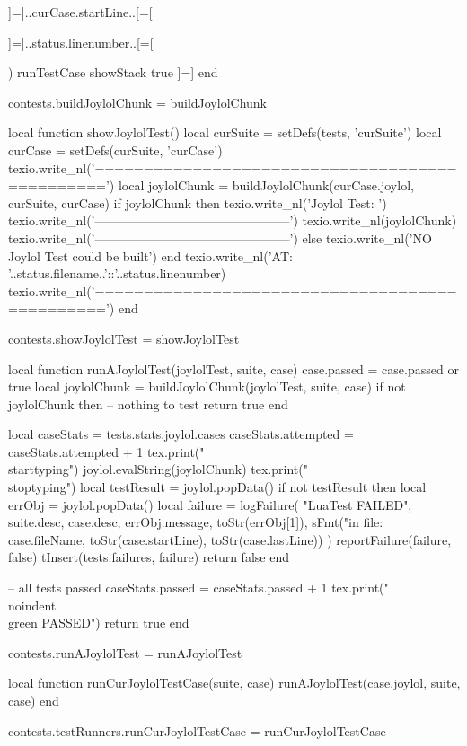   ]=]..curCase.startLine..[=[

  ]=]..status.linenumber..[=[

)
runTestCase
showStack
true
]=]
end

contests.buildJoylolChunk = buildJoylolChunk

local function showJoylolTest()
  local curSuite = setDefs(tests, 'curSuite')
  local curCase  = setDefs(curSuite, 'curCase')
  texio.write_nl('===============================================')
  local joylolChunk =
    buildJoylolChunk(curCase.joylol, curSuite, curCase)
  if joylolChunk then
    texio.write_nl('Joylol Test: ')
    texio.write_nl('-----------------------------------------------')
    texio.write_nl(joylolChunk)
    texio.write_nl('-----------------------------------------------')
  else
    texio.write_nl('NO Joylol Test could be built')
  end
  texio.write_nl('AT: '..status.filename..'::'..status.linenumber)
  texio.write_nl('===============================================')
end

contests.showJoylolTest = showJoylolTest
\stopLuaCode

\startLuaCode
local function runAJoylolTest(joylolTest, suite, case)
  case.passed = case.passed or true
  local joylolChunk = buildJoylolChunk(joylolTest, suite, case)
  if not joylolChunk then
    -- nothing to test
    return true
  end

  local caseStats = tests.stats.joylol.cases
  caseStats.attempted = caseStats.attempted + 1
  tex.print("\\starttyping")
  joylol.evalString(joylolChunk)
  tex.print("\\stoptyping")
  local testResult = joylol.popData()
  if not testResult then
    local errObj = joylol.popData()
    local failure = logFailure(
      "LuaTest FAILED",
      suite.desc,
      case.desc,
      errObj.message,
      toStr(errObj[1]),
      sFmt("in file: %
        case.fileName, toStr(case.startLine), toStr(case.lastLine))
      )
    reportFailure(failure, false)
    tInsert(tests.failures, failure)
    return false
  end

  -- all tests passed
  caseStats.passed = caseStats.passed + 1
  tex.print("\\noindent{\\green PASSED}")
  return true
end

contests.runAJoylolTest = runAJoylolTest

local function runCurJoylolTestCase(suite, case)
  runAJoylolTest(case.joylol, suite, case)
end

contests.testRunners.runCurJoylolTestCase = runCurJoylolTestCase
\stopLuaCode
